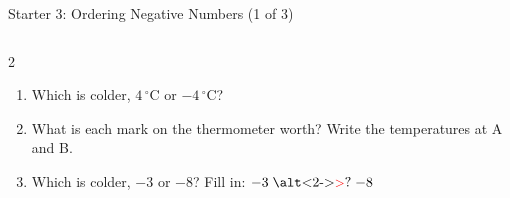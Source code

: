 \documentclass{beamer}
\newcommand{\ashow}[1]{\uncover<2->{\textcolor{red}{\small #1}}}
\newcommand{\ashowq}[1]{\alt<2->{\textcolor{red}{\small #1}}{?}}
\begin{document}
\begin{frame}{Starter 3: Ordering Negative Numbers (1 of 3)}
\begin{columns}[T]
\begin{multicols}{2}
\begin{enumerate}
  \item Which is colder, $4\,^\circ$C or $-4\,^\circ$C? \ashow{$-4\,^\circ$C}

  \item What is each mark on the thermometer worth? Write the temperatures at A and B. \ashow{$2\,^\circ$C per mark; A $=-6$, B $=4$}

  \item Which is colder, $-3$ or $-8$? Fill in: $-3 \mathrel{\text{\ashowq{$>$}}} -8$ \ashow{($-8$ is colder)}

\end{enumerate}
\end{multicols}

\end{columns}

\end{frame}
\end{document}
